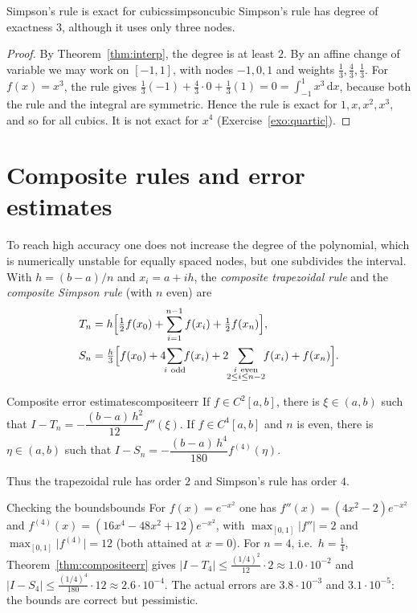 \documentclass[11pt,a4paper,twoside,openright]{book}
\newcommand{\dd}{\,\mathrm{d}}
\newcommand{\abs}[1]{\lvert #1\rvert}
\newcounter{exo}[chapter]
\begin{document}
\begin{theorem}{Simpson's rule is exact for cubics}{simpsoncubic}
Simpson's rule has degree of exactness $3$, although it uses only three nodes.
\end{theorem}
\begin{proof}
By Theorem~\ref{thm:interp}, the degree is at least $2$. By an affine change of variable we may work on $[-1,1]$, with nodes $-1,0,1$ and weights $\frac13,\frac43,\frac13$.
For $f(x)=x^{3}$, the rule gives $\frac13(-1)+\frac43\cdot0+\frac13(1)=0=\int_{-1}^{1}x^{3}\dd x$, because both the rule and the integral are symmetric.
Hence the rule is exact for $1,x,x^{2},x^{3}$, and so for all cubics. It is not exact for $x^{4}$ (Exercise~\ref{exo:quartic}).
\end{proof}

\section{Composite rules and error estimates}
To reach high accuracy one does not increase the degree of the polynomial, which is numerically unstable for equally spaced nodes, but one subdivides the interval.
With $h=(b-a)/n$ and $x_i=a+ih$, the \emph{composite trapezoidal rule} and the \emph{composite Simpson rule} (with $n$ even) are
\begin{align}
  T_n &= h\Bigl[\tfrac12 f(x_0)+\sum_{i=1}^{n-1}f(x_i)+\tfrac12 f(x_n)\Bigr], \label{eq:T}\\
  S_n &= \tfrac h3\Bigl[f(x_0)+4\!\!\sum_{i\ \text{odd}}\!\!f(x_i)+2\!\!\sum_{\substack{i\ \text{even}\\2\le i\le n-2}}\!\!f(x_i)+f(x_n)\Bigr]. \label{eq:S}
\end{align}

\begin{theorem}{Composite error estimates}{compositeerr}
If $f\in C^{2}[a,b]$, there is $\xi\in(a,b)$ such that $I-T_n=-\dfrac{(b-a)\,h^{2}}{12}f''(\xi)$.
If $f\in C^{4}[a,b]$ and $n$ is even, there is $\eta\in(a,b)$ such that $I-S_n=-\dfrac{(b-a)\,h^{4}}{180}f^{(4)}(\eta)$.
\end{theorem}

Thus the trapezoidal rule has order $2$ and Simpson's rule has order $4$.

\begin{example}{Checking the bounds}{bounds}
For $f(x)=e^{-x^{2}}$ one has $f''(x)=(4x^{2}-2)e^{-x^{2}}$ and $f^{(4)}(x)=(16x^{4}-48x^{2}+12)e^{-x^{2}}$, with $\max_{[0,1]}\abs{f''}=2$ and $\max_{[0,1]}\abs{f^{(4)}}=12$ (both attained at $x=0$).
For $n=4$, i.e.\ $h=\tfrac14$, Theorem~\ref{thm:compositeerr} gives
$\abs{I-T_4}\le\frac{(1/4)^{2}}{12}\cdot2\approx1.0\cdot10^{-2}$ and $\abs{I-S_4}\le\frac{(1/4)^{4}}{180}\cdot12\approx2.6\cdot10^{-4}$.
The actual errors are $3.8\cdot10^{-3}$ and $3.1\cdot10^{-5}$: the bounds are correct but pessimistic.
\end{example}
\end{document}
